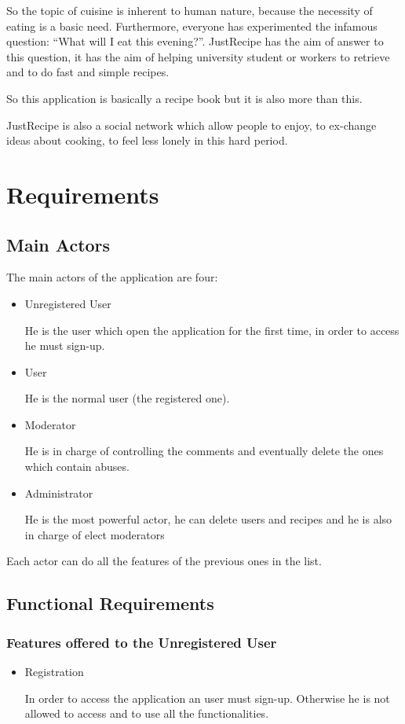 \documentclass[a4paper]{report}
\begin{document}
\noindent So the topic of cuisine is inherent to human nature, because the necessity of eating is a basic need.
Furthermore, everyone has experimented the infamous question: “What will I eat this evening?”. JustRecipe has the aim of answer to this question, it has the aim of helping university student or workers to retrieve and to do fast and simple recipes.

\noindent So this application is basically a recipe book but it is also more than this.

\noindent JustRecipe is also a social network which allow people to enjoy, to ex-change ideas about cooking, to feel less lonely in this hard period.

\section{Requirements}
\subsection{Main Actors}
The main actors of the application are four:
\begin{itemize}
	\item Unregistered User
	
	\noindent He is the user which open the application for the first time, in order to access he must sign-up.
	
	\item User
	
	\noindent He is the normal user (the registered one).
	
	\item Moderator
	
	\noindent He is in charge of controlling the comments and eventually delete the ones which contain abuses.
	
	\item Administrator
	
	\noindent He is the most powerful actor, he can delete users and recipes and he is also in charge of elect moderators
\end{itemize}

\noindent Each actor can do all the features of the previous ones in the list.

\subsection{Functional Requirements}
\subsubsection{Features offered to the Unregistered User}
\begin{itemize}
	\item  Registration
	
	\noindent In order to access the application an user must sign-up. Otherwise he is not allowed to access and to use all the functionalities.
\end{itemize}
\end{document}
